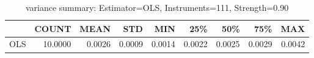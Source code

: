 \begin{table}[ht]
\centering
\caption{variance summary: Estimator=OLS, Instruments=111, Strength=0.90}
\begin{tabular}{lrrrrrrrr}
\toprule
 & COUNT & MEAN & STD & MIN & 25\% & 50\% & 75\% & MAX \\
\midrule
OLS & 10.0000 & 0.0026 & 0.0009 & 0.0014 & 0.0022 & 0.0025 & 0.0029 & 0.0042 \\
\bottomrule
\end{tabular}
\end{table}
